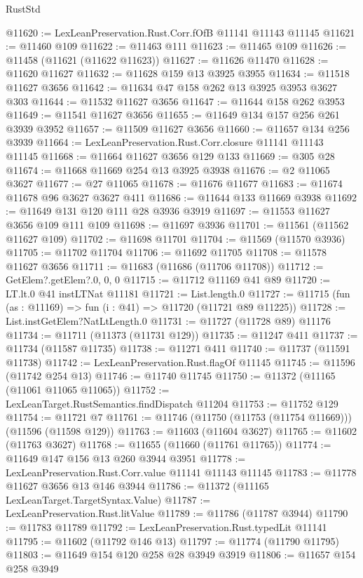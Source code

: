 \begin{lexlean}{RustStd}
\begin{coremodule}
@11620 := LexLeanPreservation.Rust.Corr.fOfB @11141 @11143 @11145
@11621 := @11460 @109
@11622 := @11463 @111
@11623 := @11465 @109
@11626 := @11458 (@11621 (@11622 @11623))
@11627 := @11626 @11470
@11628 := @11620 @11627
@11632 := @11628 @159 @13 @3925 @3955
@11634 := @11518 @11627 @3656
@11642 := @11634 @47 @158 @262 @13 @3925 @3953 @3627 @303
@11644 := @11532 @11627 @3656
@11647 := @11644 @158 @262 @3953
@11649 := @11541 @11627 @3656
@11655 := @11649 @134 @157 @256 @261 @3939 @3952
@11657 := @11509 @11627 @3656
@11660 := @11657 @134 @256 @3939
@11664 := LexLeanPreservation.Rust.Corr.closure @11141 @11143 @11145
@11668 := @11664 @11627 @3656 @129 @133
@11669 := @305 @28
@11674 := @11668 @11669 @254 @13 @3925 @3938
@11676 := @2 @11065 @3627
@11677 := @27 @11065
@11678 := @11676 @11677
@11683 := @11674 @11678 @96 @3627 @3627 @411
@11686 := @11644 @133 @11669 @3938
@11692 := @11649 @131 @120 @111 @28 @3936 @3919
@11697 := @11553 @11627 @3656 @109 @111 @109
@11698 := @11697 @3936
@11701 := @11561 (@11562 @11627 @109)
@11702 := @11698 @11701
@11704 := @11569 (@11570 @3936)
@11705 := @11702 @11704
@11706 := @11692 @11705
@11708 := @11578 @11627 @3656
@11711 := @11683 (@11686 (@11706 @11708))
@11712 := GetElem?.getElem?.{0, 0, 0}
@11715 := @11712 @11169 @41 @89
@11720 := LT.lt.{0} @41 instLTNat @11181
@11721 := List.length.{0}
@11727 := @11715 (fun (as : @11169) => fun (i : @41) => @11720 (@11721 @89 @11225))
@11728 := List.instGetElem?NatLtLength.{0}
@11731 := @11727 (@11728 @89) @11176
@11734 := @11711 (@11373 (@11731 @129))
@11735 := @11247 @411
@11737 := @11734 (@11587 @11735)
@11738 := @11271 @411
@11740 := @11737 (@11591 @11738)
@11742 := LexLeanPreservation.Rust.flagOf @11145
@11745 := @11596 (@11742 @254 @13)
@11746 := @11740 @11745
@11750 := @11372 (@11165 (@11061 @11065 @11065))
@11752 := LexLeanTarget.RustSemantics.findDispatch @11204
@11753 := @11752 @129
@11754 := @11721 @7
@11761 := @11746 (@11750 (@11753 (@11754 @11669))) (@11596 (@11598 @129))
@11763 := @11603 (@11604 @3627)
@11765 := @11602 (@11763 @3627)
@11768 := @11655 (@11660 (@11761 @11765))
@11774 := @11649 @147 @156 @13 @260 @3944 @3951
@11778 := LexLeanPreservation.Rust.Corr.value @11141 @11143 @11145
@11783 := @11778 @11627 @3656 @13 @146 @3944
@11786 := @11372 (@11165 LexLeanTarget.TargetSyntax.Value)
@11787 := LexLeanPreservation.Rust.litValue
@11789 := @11786 (@11787 @3944)
@11790 := @11783 @11789
@11792 := LexLeanPreservation.Rust.typedLit @11141
@11795 := @11602 (@11792 @146 @13)
@11797 := @11774 (@11790 @11795)
@11803 := @11649 @154 @120 @258 @28 @3949 @3919
@11806 := @11657 @154 @258 @3949

\end{coremodule}
\end{lexlean}
